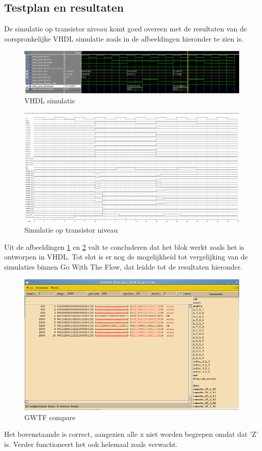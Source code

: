 \documentclass{scrartcl} %
\begin{document}
\subsection{Testplan en resultaten}
 De simulatie op transistor niveau komt goed overeen met de resultaten van de oorspronkelijke VHDL simulatie zoals in de afbeeldingen hieronder te zien is.
\begin{figure} [h!]
\includegraphics [width = \textwidth] {resource/dp_sim}
\caption{VHDL simulatie}
\label{fig:dpsim}
\end{figure}

\begin{figure} [h!]
\includegraphics [width = \textwidth] {resource/dp_sw_lev}
\caption{Simulatie op transistor niveau}
\label{fig:dpswitchl}
\end{figure}
Uit de afbeeldingen \ref{fig:dpsim} en \ref{fig:dpswitchl} valt te concluderen dat het blok werkt zoals het is ontworpen in VHDL. Tot slot is er nog de mogelijkheid tot vergelijking van de simulaties binnen Go With The Flow, dat leidde tot de resultaten hieronder.
\begin{figure} [h!]
\includegraphics [width = \textwidth] {resource/dp_comp}
\caption{GWTF compare}
\label{fig:dpcomp}
\end{figure}
Het bovenstaande is correct, aangezien alle x niet worden begrepen omdat dat 'Z' is. Verder functioneert het ook helemaal zoals verwacht.
\end{document}
